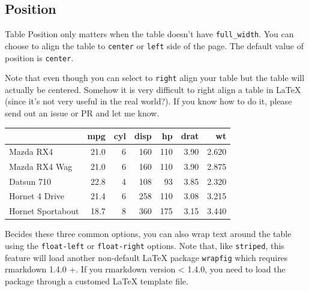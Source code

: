 \documentclass[table]{article}
\newenvironment{Shaded}{\begin{snugshade}}{\end{snugshade}}
\newcommand{\DataTypeTok}[1]{\textcolor[rgb]{0.13,0.29,0.53}{#1}}
\newcommand{\KeywordTok}[1]{\textcolor[rgb]{0.13,0.29,0.53}{\textbf{#1}}}
\newcommand{\NormalTok}[1]{#1}
\newcommand{\OperatorTok}[1]{\textcolor[rgb]{0.81,0.36,0.00}{\textbf{#1}}}
\newcommand{\StringTok}[1]{\textcolor[rgb]{0.31,0.60,0.02}{#1}}
\begin{document}
\hypertarget{position}{%
\subsection{Position}\label{position}}

Table Position only matters when the table doesn't have
\texttt{full\_width}. You can choose to align the table to
\texttt{center} or \texttt{left} side of the page. The default value of
position is \texttt{center}.

Note that even though you can select to \texttt{right} align your table
but the table will actually be centered. Somehow it is very difficult to
right align a table in LaTeX (since it's not very useful in the real
world?). If you know how to do it, please send out an issue or PR and
let me know.

\begin{Shaded}
\end{Shaded}

\begin{table}[H]
\centering
\begin{tabular}{lrrrrrr}
\toprule
  & mpg & cyl & disp & hp & drat & wt\\
\midrule
Mazda RX4 & 21.0 & 6 & 160 & 110 & 3.90 & 2.620\\
Mazda RX4 Wag & 21.0 & 6 & 160 & 110 & 3.90 & 2.875\\
Datsun 710 & 22.8 & 4 & 108 & 93 & 3.85 & 2.320\\
Hornet 4 Drive & 21.4 & 6 & 258 & 110 & 3.08 & 3.215\\
Hornet Sportabout & 18.7 & 8 & 360 & 175 & 3.15 & 3.440\\
\bottomrule
\end{tabular}
\end{table}

Becides these three common options, you can also wrap text around the
table using the \texttt{float-left} or \texttt{float-right} options.
Note that, like \texttt{striped}, this feature will load another
non-default LaTeX package \texttt{wrapfig} which requires rmarkdown
1.4.0 +. If you rmarkdown version \textless{} 1.4.0, you need to load
the package through a customed LaTeX template file.
\end{document}
